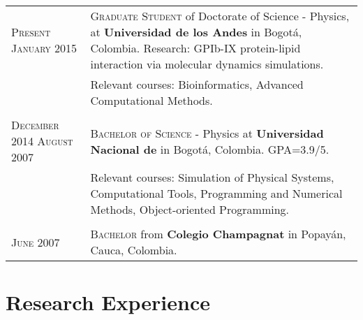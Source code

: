 \documentclass[a4paper,10pt]{article} %
\begin{document}
\begin{tabular}{p{2.7cm}p{11.4cm}}	

\textsc{Present} \newline \textsc{January 2015} & \textsc{Graduate Student} of Doctorate of Science - Physics, at \textbf{Universidad de los Andes} in Bogot\'a, Colombia. Research: GPIb-IX protein-lipid interaction via molecular dynamics simulations.\\
& Relevant courses: Bioinformatics, Advanced Computational Methods. \\
\\
\textsc{December 2014} \newline \textsc{August 2007} & \textsc{Bachelor of Science} - Physics at \textbf{Universidad Nacional de}  in Bogot\'a, Colombia. GPA=3.9/5. \\ & Relevant courses: Simulation of Physical Systems, Computational Tools, Programming and Numerical Methods, Object-oriented Programming. \\
\\
\textsc{June 2007}& \textsc{}\textsc{Bachelor} from \normalsize\textbf{Colegio Champagnat} in Popay\'an, Cauca, Colombia.
\end{tabular}


\color{OrangeRed}
\section{Research Experience}
\color{black}
\end{document}

